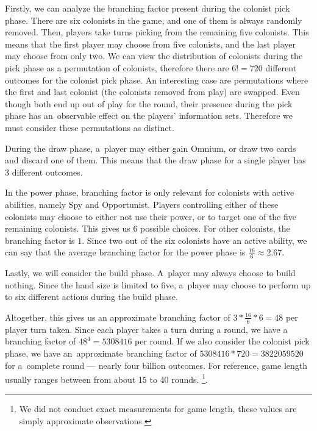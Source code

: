 Firstly, we can analyze the branching factor present during the colonist pick phase.
There are six colonists in the game, and one of them is always randomly
removed. Then, players take turns picking from the remaining five colonists.
This means that the first player may choose from five colonists, and the last
player may choose from only two. We can view the distribution of colonists during the
pick phase as a permutation of colonists, therefore there are $6! = 720$
different outcomes for the colonist pick phase. An interesting case are permutations
where the first and last colonist (the colonists removed from play) are swapped.
Even though both end up out of play for the round, their presence during the pick
phase has an~observable effect on the players' information sets. Therefore we must
consider these permutations as distinct.

During the draw phase, a~player may either gain Omnium, or draw two cards and discard
one of them. This means that the draw phase for a single player has $3$ different outcomes.

In the power phase, branching factor is only relevant for colonists with active abilities,
namely Spy and Opportunist. Players controlling either of these colonists may choose
to either not use their power, or to target one of the five remaining colonists.
This gives us $6$ possible choices. For other colonists, the branching
factor is $1$. Since two out of the six colonists have an active ability,
we can say that the average branching factor for the power phase is
$\frac{16}{6} \approx 2.67$.

Lastly, we will consider the build phase. A~player may always choose to build nothing.
Since the hand size is limited to five, a~player may choose to perform up to six
different actions during the build phase.

Altogether, this gives us an approximate branching factor of $3 * \frac{16}{6} * 6 = 48$
per player turn taken. Since each player takes a turn during a round, we have
a branching factor of $48^{4} = 5 308 416$ per round. If we also consider the colonist pick phase,
we have an~approximate branching factor of $5 308 416 * 720 = 3 822 059 520$ for a~complete
round --- nearly four billion outcomes. For reference, game length usually ranges
between from about 15 to 40 rounds.
\footnote{We did not conduct exact measurements for game length, these values are simply
approximate observations.}.
